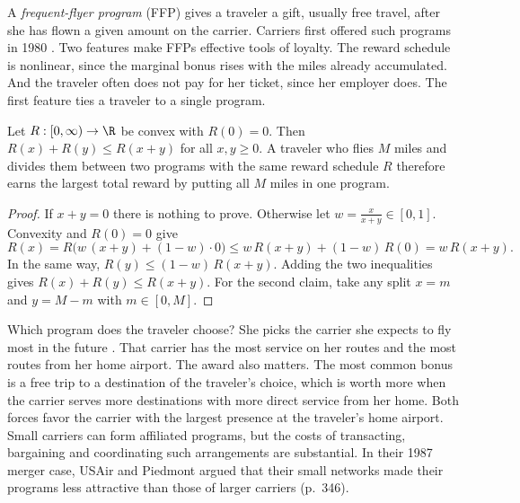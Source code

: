 A \emph{frequent-flyer program} (FFP) gives a traveler a gift, usually free travel, after she has flown a given
amount on the carrier. Carriers first offered such programs in 1980 \citep[p.~346]{Borenstein1989}. Two
features make FFPs effective tools of loyalty. The reward schedule is nonlinear, since the marginal bonus rises
with the miles already accumulated. And the traveler often does not pay for her ticket, since her employer does.
The first feature ties a traveler to a single program.

\begin{lemma}\label{lem:09-ffp}
Let $R:[0,\infty) \to \R$ be convex with $R(0) = 0$. Then $R(x) + R(y) \le R(x+y)$ for all $x, y \ge 0$. A
traveler who flies $M$ miles and divides them between two programs with the same reward schedule $R$ therefore
earns the largest total reward by putting all $M$ miles in one program.
\end{lemma}

\begin{proof}
If $x + y = 0$ there is nothing to prove. Otherwise let $w = \frac{x}{x+y} \in [0,1]$. Convexity and
$R(0) = 0$ give
\begin{equation*}
  R(x) = R\big(w\,(x+y) + (1-w)\cdot 0\big) \le w\,R(x+y) + (1-w)\,R(0) = w\,R(x+y).
\end{equation*}
In the same way, $R(y) \le (1-w)\,R(x+y)$. Adding the two inequalities gives $R(x) + R(y) \le R(x+y)$. For
the second claim, take any split $x = m$ and $y = M - m$ with $m \in [0, M]$.
\end{proof}

Which program does the traveler choose? She picks the carrier she expects to fly most in the future
\citep[p.~346]{Borenstein1989}. That carrier has the most service on her routes and the most routes from her
home airport. The award also matters. The most common bonus is a free trip to a destination
of the traveler's choice, which is worth more when the carrier serves more destinations with more direct
service from her home. Both forces favor the carrier with the largest presence at the traveler's home airport.
Small carriers can form affiliated programs, but the costs of transacting, bargaining and coordinating such
arrangements are substantial. In their 1987 merger case, USAir and Piedmont argued that their small networks
made their programs less attractive than those of larger carriers (p.~346).

